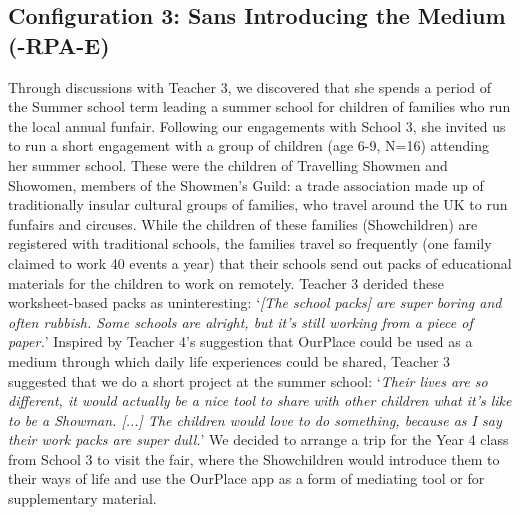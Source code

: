 \documentclass[,hyphens]{sigchi}
\begin{document}
\subsection{Configuration 3: Sans Introducing the Medium (-RPA-E)}
Through discussions with Teacher 3, we discovered that she spends a period of the Summer school term leading a summer school for children of families who run the local annual funfair. Following our engagements with School 3, she invited us to run a short engagement with a group of children (age 6-9, N=16) attending her summer school. These were the children of Travelling Showmen and Showomen, members of the Showmen's Guild: a trade association made up of traditionally insular cultural groups of families, who travel around the UK to run funfairs and circuses. While the children of these families (Showchildren) are registered with traditional schools, the families travel so frequently (one family claimed to work 40 events a year) that their schools send out packs of educational materials for the children to work on remotely. Teacher 3 derided these worksheet-based packs as uninteresting: `\textit{[The school packs] are super boring and often rubbish. Some schools are alright, but it's still working from a piece of paper.}' Inspired by Teacher 4's suggestion that OurPlace could be used as a medium through which daily life experiences could be shared, Teacher 3 suggested that we do a short project at the summer school: `\textit{Their lives are so different, it would actually be a nice tool to share with other children what it's like to be a Showman. [...] The children would love to do something, because as I say their work packs are super dull.}' We decided to arrange a trip for the Year 4 class from School 3 to visit the fair, where the Showchildren would introduce them to their ways of life and use the OurPlace app as a form of mediating tool or for supplementary material.
\end{document}
